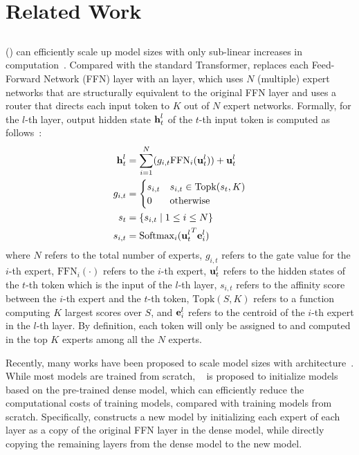 \section{Related Work}
\subsection{\moefull}
\moefull (\moe) can efficiently scale up model sizes with only sub-linear increases in computation~\cite{shazeer2017outrageously}. 
Compared with the standard Transformer, \moe replaces each Feed-Forward Network (FFN) layer with an \moe layer, which uses $N$ (\ie multiple) expert networks that are structurally equivalent to the original FFN layer and uses a router that directs each input token to $K$ out of $N$ expert networks. 
Formally, for the $l$-th \moe layer, output hidden state $\mbox{\textbf{h}}_t^l$ of the $t$-th input token is computed as follows~\cite{dai2024deepseekmoe}:
\begin{equation}\label{formula:moe}
\begin{split}
\mbox{\textbf{h}}_t^l &= \sum_{i=1}^{N}(g_{i,t}\mbox{FFN}_i(\mbox{\textbf{u}}_t^l)) + \mbox{\textbf{u}}_t^l \\
g_{i,t} &= 
\begin{cases}
 s_{i,t} & s_{i,t}\in  \mbox{Topk}(s_t, K) \\
    0 & \text{otherwise}
\end{cases} \\
s_t &= \{s_{i,t} \mid 1\leq i\leq N\} \\
s_{i,t} &= \mbox{Softmax}_i({\mbox{\textbf{u}}_t^l}^T\mbox{\textbf{e}}_i^l)
\end{split}
\end{equation}
where $N$ refers to the total number of experts, $g_{i,t}$ refers to the gate value for the $i$-th expert, $\mbox{FFN}_i(\cdot)$ refers to the $i$-th expert, $\mbox{\textbf{u}}_t^l$ refers to the hidden states of the $t$-th token which is the input of the $l$-th \moe layer, $s_{i,t}$ refers to the affinity score between the $i$-th expert and the $t$-th token, $\mbox{Topk}(S, K)$ refers to a function computing $K$ largest scores over $S$, and $\mbox{\textbf{e}}_i^l$ refers to the centroid of the $i$-th expert in the $l$-th \moe layer. By definition, each token will only be assigned to and computed in the top $K$ experts among all the $N$ experts.

Recently, many works have been proposed to scale model sizes with \moe architecture~\cite{lepikhin2020gshard, du2022glam, fedus2022switch, jiang2024mixtral, xue2024openmoe}. While 
most \moe models are trained from scratch, \sparseupcycle~\cite{komatsuzaki2023sparse} is proposed to initialize \moe models based on the pre-trained dense model, which can efficiently reduce the computational costs of training \moe models, compared with training \moe models from scratch. 
Specifically, \sparseupcycle constructs a new \moe model by initializing each expert of each \moe layer as a copy of the original FFN layer in the dense model, while directly copying the remaining layers from the dense model to the new \moe model.

